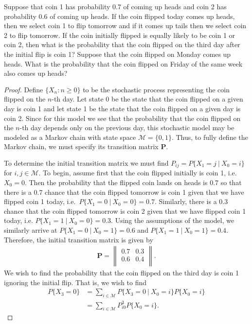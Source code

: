 \begin{problem}{4.8}
  Suppose that coin 1 has probability 0.7 of coming up heads and coin 2 has probability
  0.6 of coming up heads. If the coin flipped today comes up heads, then we select
  coin 1 to flip tomorrow and if it comes up tails then we select coin 2 to flip tomorrow.
  If the coin initially flipped is equally likely to be coin 1 or coin 2, then
  what is the probability that the coin flipped on the third day after the initial
  flip is coin 1? Suppose that the coin flipped on Monday comes up heads. What is the probability
  that the coin flipped on Friday of the same week also comes up heads?
\end{problem}

\begin{proof}
  Define $\{X_n : n \geq 0\}$ to be the stochastic process representing the
  coin flipped on the $n$-th day. Let state 0 be the state that the coin
  flipped on a given day is coin 1 and let state 1 be the state that the coin
  flipped on a given day is coin 2. Since for this model we see
  that the probability that the coin flipped on the $n$-th day depends only on
  the previous day, this stochastic model may be modeled as a Markov chain with state
  space $\mathcal{M} = \{0, 1\}$. Thus, to fully define the Markov chain, we must
  specify its transition matrix $\boldsymbol{P}$.

  To determine the initial transition matrix
  we must find $P_{ij} = P\{X_1 = j \ |\ X_0 = i\}$ for $i, j \in \mathcal{M}$. To begin, assume first that the coin
  flipped initially is coin 1, i.e.\ $X_0 = 0$. Then the probability that the flipped coin lands on heads is 0.7 so
  that there is a 0.7 chance that the coin flipped tomorrow is coin 1 given that we have flipped coin 1 today, i.e.\ $P\{X_1 = 0 \ |\ X_0 = 0\} = 0.7$.
  Similarly, there is a 0.3 chance that the coin flipped tomorrow is coin 2 given that we
  have flipped coin 1 today, i.e. $P\{X_1 = 1 \ |\ X_0 = 0\} = 0.3$. Using the assumptions of
  the model, we similarly arrive at $P\{X_1 = 0 \ |\ X_0 = 1\} = 0.6$ and
  $P\{X_1 = 1 \ |\ X_0 = 1\} = 0.4$. Therefore,
  the initial transition matrix is given by
  \begin{align*}
    \boldsymbol{P} =
    \begin{Vmatrix}
      0.7 & 0.3 \\
      0.6 & 0.4 \\
    \end{Vmatrix}.
  \end{align*}
  We wish to find the probability that the coin flipped on the third day is coin 1 ignoring the initial flip.
  That is, we wish to find
  \begin{align*}
    P\{X_3=0\} &= \sum_{i\in\mathcal{M}}P\{X_3 = 0 \ |\ X_0 = i\}P\{X_0 = i\} \\
    &= \sum_{i\in\mathcal{M}}P_{i0}^3P\{X_0 = i\}.
  \end{align*}


\end{proof}
